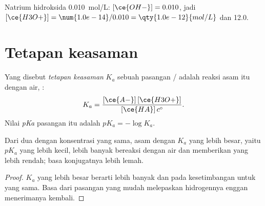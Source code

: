 \begin{example}\label{ex:g12:ka-and-pka:naoh}
Natrium hidroksida \qty{0.010}{mol/L}: $[\ce{OH-}] = 0.010$, jadi
$[\ce{H3O+}] = \num{1.0e-14}/0.010 = \qty{1.0e-12}{mol/L}$ dan  12.0.
\end{example}

\section{Tetapan keasaman}

\begin{definition}\label{def:g12:ka-and-pka:ka}
Yang disebut \emph{tetapan keasaman} $K_a$
sebuah pasangan / adalah  reaksi
asam itu dengan air, :
\[
  K_a = \frac{[\ce{A-}]\,[\ce{H3O+}]}{[\ce{HA}]\,c^\circ} .
\]
Nilai \emph{pKa} pasangan itu adalah
$pK_a = -\log K_a$.
\end{definition}

\begin{proposition}\label{prop:g12:ka-and-pka:compare}
Dari dua  dengan konsentrasi yang sama, asam dengan $K_a$ yang
lebih besar, yaitu $pK_a$ yang lebih kecil, lebih banyak bereaksi
dengan air dan memberikan  yang lebih rendah; basa konjugatnya lebih
lemah.
\end{proposition}

\begin{proof}
$K_a$ yang lebih besar berarti lebih banyak  dan  pada
kesetimbangan untuk  yang sama. Basa  dari pasangan yang
mudah melepaskan  hidrogennya enggan menerimanya kembali.
\end{proof}


